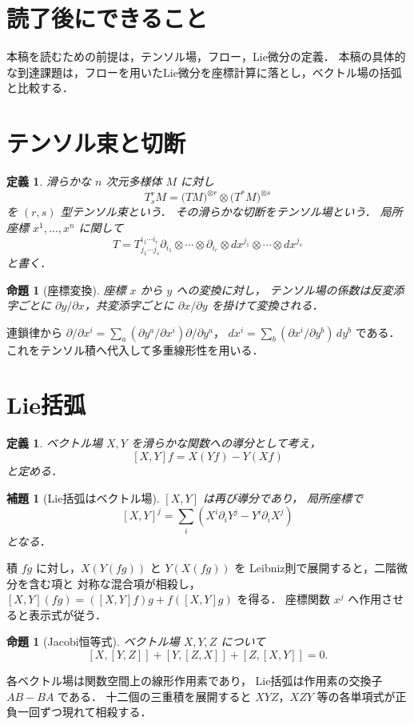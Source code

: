 \documentclass[a5paper,10pt,onecolumn]{jsarticle}
\makeatletter
\theoremstyle{mathnotetheorem}
\newtheorem{definition}[theorem]{定義}
\newtheorem{lemma}[theorem]{補題}
\newtheorem{proposition}[theorem]{命題}
\renewcommand{\proofname}{証明}
\renewenvironment{proof}[1][\proofname]{%
  \par\pushQED{\qed}\normalfont\topsep4\p@\@plus2\p@\relax
  \trivlist\item[\hskip\labelsep\bfseries #1]\ignorespaces
}{\popQED\endtrivlist\@endpefalse}
\makeatother
\begin{document}
\section*{読了後にできること}
本稿を読むための前提は，テンソル場，フロー，Lie微分の定義．
本稿の具体的な到達課題は，フローを用いたLie微分を座標計算に落とし，ベクトル場の括弧と比較する．


\section{テンソル束と切断}
\begin{definition}
滑らかな $n$ 次元多様体 $M$ に対し
\[
 T^r_sM=
 \bigl(TM\bigr)^{\otimes r}
 \otimes\bigl(T^*M\bigr)^{\otimes s}
\]
を $(r,s)$ 型テンソル束という．
その滑らかな切断をテンソル場という．
局所座標 $x^1,\dots,x^n$ に関して
\[
 T=T^{i_1\cdots i_r}_{j_1\cdots j_s}
 \partial_{i_1}\otimes\cdots\otimes\partial_{i_r}
 \otimes dx^{j_1}\otimes\cdots\otimes dx^{j_s}
\]
と書く．
\end{definition}
\begin{proposition}[座標変換]
座標 $x$ から $y$ への変換に対し，
テンソル場の係数は反変添字ごとに
$\partial y/\partial x$，共変添字ごとに
$\partial x/\partial y$ を掛けて変換される．
\end{proposition}
\begin{proof}
連鎖律から
$\partial/\partial x^i=\sum_a(\partial y^a/\partial x^i)
\partial/\partial y^a$，
$dx^i=\sum_b(\partial x^i/\partial y^b)\,dy^b$
である．これをテンソル積へ代入して多重線形性を用いる．
\end{proof}
\section{Lie括弧}
\begin{definition}
ベクトル場 $X,Y$ を滑らかな関数への導分として考え，
\[
 [X,Y]f=X(Yf)-Y(Xf)
\]
と定める．
\end{definition}
\begin{lemma}[Lie括弧はベクトル場]
$[X,Y]$ は再び導分であり，
局所座標で
\[
 [X,Y]^j=\sum_i(X^i\partial_iY^j-Y^i\partial_iX^j)
\]
となる．
\end{lemma}
\begin{proof}
積 $fg$ に対し，$X(Y(fg))$ と $Y(X(fg))$ を
Leibniz則で展開すると，二階微分を含む項と
対称な混合項が相殺し，
$[X,Y](fg)=([X,Y]f)g+f([X,Y]g)$ を得る．
座標関数 $x^j$ へ作用させると表示式が従う．
\end{proof}
\begin{proposition}[Jacobi恒等式]
ベクトル場 $X,Y,Z$ について
\[
 [X,[Y,Z]]+[Y,[Z,X]]+[Z,[X,Y]]=0.
\]
\end{proposition}
\begin{proof}
各ベクトル場は関数空間上の線形作用素であり，
Lie括弧は作用素の交換子 $AB-BA$ である．
十二個の三重積を展開すると
$XYZ$，$XZY$ 等の各単項式が正負一回ずつ現れて相殺する．
\end{proof}
\end{document}
